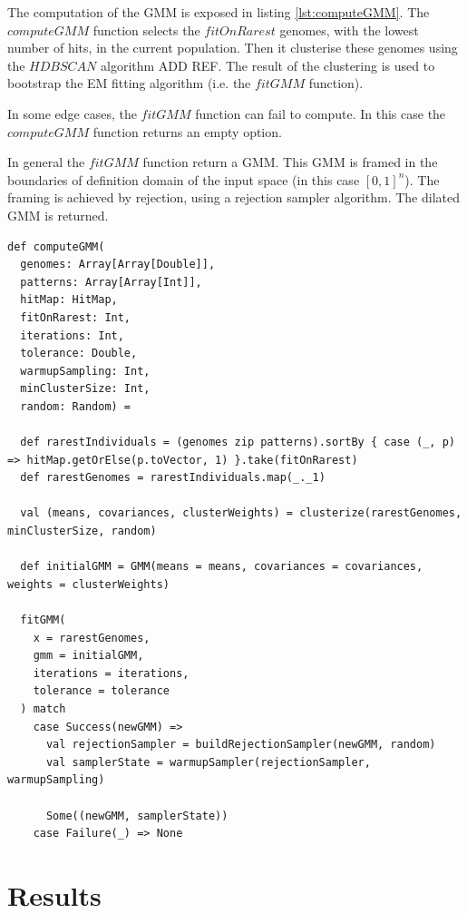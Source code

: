 \documentclass[10pt,letterpaper]{article}
\theoremstyle{definition}
\theoremstyle{remark}
\begin{document}
The computation of the GMM is exposed in listing \ref{lst:computeGMM}. The $computeGMM$ function selects the $fitOnRarest$ genomes,  with the lowest number of hits, in the current population. Then it clusterise these genomes using the $HDBSCAN$  algorithm {\color{red} ADD REF}. The result of the clustering is used to bootstrap the EM fitting algorithm (i.e. the $fitGMM$ function). 

In some edge cases, the $fitGMM$ function can fail to compute. In this case the $computeGMM$ function returns an empty option.

In general the $fitGMM$ function return a GMM. This GMM is framed in the boundaries of definition domain of the input space (in this case $[0,1]^n$). The framing is achieved by rejection, using a rejection sampler algorithm. The dilated GMM is returned.

\begin{lstlisting}[caption={Compute GMM},label={lst:computeGMM}]
def computeGMM(
  genomes: Array[Array[Double]],
  patterns: Array[Array[Int]],
  hitMap: HitMap,
  fitOnRarest: Int,
  iterations: Int,
  tolerance: Double,
  warmupSampling: Int,
  minClusterSize: Int,
  random: Random) =

  def rarestIndividuals = (genomes zip patterns).sortBy { case (_, p) => hitMap.getOrElse(p.toVector, 1) }.take(fitOnRarest)
  def rarestGenomes = rarestIndividuals.map(_._1)

  val (means, covariances, clusterWeights) = clusterize(rarestGenomes, minClusterSize, random)

  def initialGMM = GMM(means = means, covariances = covariances, weights = clusterWeights)

  fitGMM(
    x = rarestGenomes,
    gmm = initialGMM,
    iterations = iterations,
    tolerance = tolerance
  ) match
    case Success(newGMM) =>
      val rejectionSampler = buildRejectionSampler(newGMM, random)
      val samplerState = warmupSampler(rejectionSampler, warmupSampling)

      Some((newGMM, samplerState))
    case Failure(_) => None
\end{lstlisting}


\section*{Results}
\label{sec. evaluation}
\end{document}

